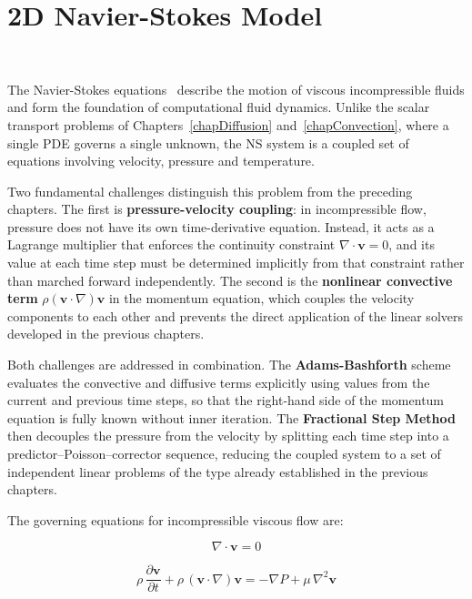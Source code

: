 \section{2D Navier-Stokes Model}~\label{chapNavierStokes}

The Navier-Stokes equations~\cite{Shames2003} describe the motion of viscous incompressible fluids and form the foundation of computational fluid dynamics. Unlike the scalar transport problems of Chapters~\ref{chapDiffusion} and~\ref{chapConvection}, where a single PDE governs a single unknown, the NS system is a coupled set of equations involving velocity, pressure and temperature.

Two fundamental challenges distinguish this problem from the preceding chapters. The first is \textbf{pressure-velocity coupling}: in incompressible flow, pressure does not have its own time-derivative equation. Instead, it acts as a Lagrange multiplier that enforces the continuity constraint $\nabla \cdot \mathbf{v} = 0$, and its value at each time step must be determined implicitly from that constraint rather than marched forward independently. The second is the \textbf{nonlinear convective term} $\rho(\mathbf{v} \cdot \nabla)\mathbf{v}$ in the momentum equation, which couples the velocity components to each other and prevents the direct application of the linear solvers developed in the previous chapters.

Both challenges are addressed in combination. The \textbf{Adams-Bashforth} scheme evaluates the convective and diffusive terms explicitly using values from the current and previous time steps, so that the right-hand side of the momentum equation is fully known without inner iteration. The \textbf{Fractional Step Method}~\cite{Ferziger2002} then decouples the pressure from the velocity by splitting each time step into a predictor–Poisson–corrector sequence, reducing the coupled system to a set of independent linear problems of the type already established in the previous chapters.

The governing equations for incompressible viscous flow are:

\begin{equation}\label{eqNSMass}
    \nabla \cdot \mathbf{v} = 0
\end{equation}

\begin{equation}\label{eqNSMomentum}
    \rho\,\frac{\partial \mathbf{v}}{\partial t} + \rho\,(\mathbf{v} \cdot \nabla)\mathbf{v} = -\nabla P + \mu\,\nabla^2 \mathbf{v}
\end{equation}

